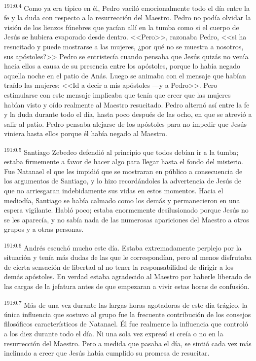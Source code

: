 \par 
\textsuperscript{191:0.4} Como ya era típico en él, Pedro vaciló emocionalmente todo el día entre la fe y la duda con respecto a la resurrección del Maestro. Pedro no podía olvidar la visión de los lienzos fúnebres que yacían allí en la tumba como si el cuerpo de Jesús se hubiera evaporado desde dentro. <<Pero>>, razonaba Pedro, <<si ha resucitado y puede mostrarse a las mujeres, ¿por qué no se muestra a nosotros, sus apóstoles?>> Pedro se entristecía cuando pensaba que Jesús quizás no venía hacia ellos a causa de su presencia entre los apóstoles, porque lo había negado aquella noche en el patio de Anás. Luego se animaba con el mensaje que habían traído las mujeres: <<Id a decir a mis apóstoles ---y a Pedro>>. Pero estimularse con este mensaje implicaba que tenía que creer que las mujeres habían visto y oído realmente al Maestro resucitado. Pedro alternó así entre la fe y la duda durante todo el día, hasta poco después de las ocho, en que se atrevió a salir al patio. Pedro pensaba alejarse de los apóstoles para no impedir que Jesús viniera hasta ellos porque él había negado al Maestro.

\par 
\textsuperscript{191:0.5} Santiago Zebedeo defendió al principio que todos debían ir a la tumba; estaba firmemente a favor de hacer algo para llegar hasta el fondo del misterio. Fue Natanael el que les impidió que se mostraran en público a consecuencia de los argumentos de Santiago, y lo hizo recordándoles la advertencia de Jesús de que no arriesgaran indebidamente sus vidas en estos momentos. Hacia el mediodía, Santiago se había calmado como los demás y permanecieron en una espera vigilante. Habló poco; estaba enormemente desilusionado porque Jesús no se les aparecía, y no sabía nada de las numerosas apariciones del Maestro a otros grupos y a otras personas.

\par 
\textsuperscript{191:0.6} Andrés escuchó mucho este día. Estaba extremadamente perplejo por la situación y tenía más dudas de las que le correspondían, pero al menos disfrutaba de cierta sensación de libertad al no tener la responsabilidad de dirigir a los demás apóstoles. En verdad estaba agradecido al Maestro por haberle liberado de las cargas de la jefatura antes de que empezaran a vivir estas horas de confusión.

\par 
\textsuperscript{191:0.7} Más de una vez durante las largas horas agotadoras de este día trágico, la única influencia que sostuvo al grupo fue la frecuente contribución de los consejos filosóficos característicos de Natanael. Él fue realmente la influencia que controló a los diez durante todo el día. Ni una sola vez expresó si creía o no en la resurrección del Maestro. Pero a medida que pasaba el día, se sintió cada vez más inclinado a creer que Jesús había cumplido su promesa de resucitar.


